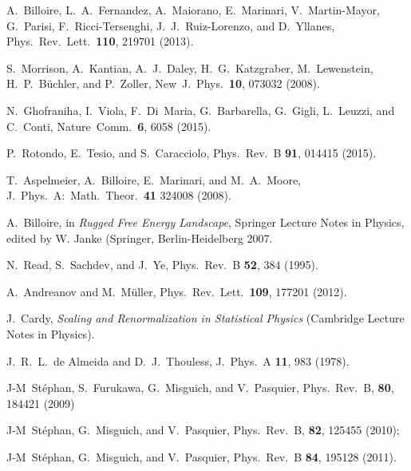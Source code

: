 \documentclass[twocolumn,superscriptaddress,prb,10pt]{revtex4-1}
\begin{document}
\begin{thebibliography}{99}
A.~Billoire, L.~A.~Fernandez, A.~Maiorano, E.~Marinari, 
V.~Martin-Mayor, G.~Parisi, F.~Ricci-Tersenghi, J.~J.~Ruiz-Lorenzo, 
and D.~Yllanes, Phys.\ Rev.\ Lett.\ {\bf 110}, 219701 (2013).

S.~Morrison, A.~Kantian, A.~J.~Daley, H.~G.~Katzgraber, M.~Lewenstein, 
H.~P.~B\"uchler, and P.~Zoller, New\ J.\ Phys.\ {\bf 10}, 
073032 (2008). 

N.~Ghofraniha, I.~Viola, F.~Di~Maria, G.~Barbarella, G.~Gigli, L.~Leuzzi, 
and C.~Conti, Nature\ Comm.\ {\bf 6}, 6058 (2015). 

P.~Rotondo, E.~Tesio, and S.~Caracciolo, Phys.\ Rev.\ B {\bf 91}, 
014415 (2015). 




T.~Aspelmeier, A.~Billoire, E.~Marinari, and M.~A.~Moore, 
J.\ Phys.\ A:\ Math.\ Theor.\ {\bf 41} 324008 (2008). 

A.~Billoire, in \emph{Rugged Free Energy Landscape}, Springer Lecture 
Notes in Physics, edited by W. Janke (Springer, Berlin-Heidelberg 
2007. 

N.~Read, S.~Sachdev, and J.~Ye, Phys.\ Rev.\ B {\bf 52}, 384 (1995). 

A.~Andreanov and M.~M\"uller, Phys.\ Rev.\ Lett.\ {\bf 109}, 177201 (2012). 

J.~Cardy, \emph{Scaling and Renormalization in Statistical Physics} 
(Cambridge Lecture Notes in Physics). 

J.~R.~L.~de Almeida and D.~J.~Thouless, J.\ Phys.\ A {\bf 11}, 983 (1978). 

J-M~St\'ephan, S.~Furukawa, G.~Misguich, and V.~Pasquier, Phys.\ Rev.\ B, {\bf 80}, 
184421 (2009)

J-M~St\'ephan, G.~Misguich, and V.~Pasquier, Phys.\ Rev.\ B, {\bf 82}, 125455 
(2010); 

J-M~St\'ephan, G.~Misguich, and V.~Pasquier, Phys.\ Rev.\ B {\bf 84}, 
195128 (2011).


\end{thebibliography}
\end{document}

